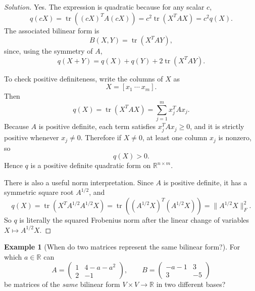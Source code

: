 \documentclass[11pt]{article}
\theoremstyle{definition}
\newtheorem{example}{Example}[section]
\newcommand{\R}{\mathbb{R}}
\newcommand{\trace}{\operatorname{tr}}
\begin{document}
\begin{proof}[Solution]
Yes. The expression is quadratic because for any scalar $c$,
\[
q(cX)=\trace((cX)^TA(cX))=c^2\trace(X^TAX)=c^2 q(X).
\]
The associated bilinear form is
\[
B(X,Y)=\trace(X^TAY),
\]
since, using the symmetry of $A$,
\[
q(X+Y)=q(X)+q(Y)+2\trace(X^TAY).
\]

To check positive definiteness, write the columns of $X$ as
\[
X=[x_1\ \cdots\ x_m].
\]
Then
\[
q(X)=\trace(X^TAX)=\sum_{j=1}^m x_j^T A x_j.
\]
Because $A$ is positive definite, each term satisfies $x_j^TAx_j\ge 0$, and it is strictly positive whenever $x_j\neq 0$. Therefore if $X\neq 0$, at least one column $x_j$ is nonzero, so
\[
q(X)>0.
\]
Hence $q$ is a positive definite quadratic form on $\R^{n\times m}$.

There is also a useful norm interpretation. Since $A$ is positive definite, it has a symmetric square root $A^{1/2}$, and
\[
q(X)=\trace(X^TA^{1/2}A^{1/2}X)=\trace((A^{1/2}X)^T(A^{1/2}X))=\|A^{1/2}X\|_F^2.
\]
So $q$ is literally the squared Frobenius norm after the linear change of variables $X\mapsto A^{1/2}X$.
\end{proof}

\begin{example}[When do two matrices represent the same bilinear form?]
For which $a\in\R$ can
\[
A=\begin{pmatrix}1&4-a-a^2\\2&-1\end{pmatrix}, \qquad B=\begin{pmatrix}-a-1&3\\3&-5\end{pmatrix}
\]
be matrices of the \emph{same} bilinear form $V\times V\to\R$ in two different bases?
\end{example}
\end{document}
